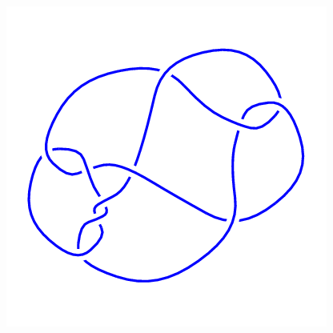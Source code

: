 \begin{figure}[H]
\begin{minipage}[b]{.18\linewidth}
	\end{minipage}
	\begin{minipage}[b]{.18\linewidth}
		\centering
		\includegraphics[width=\linewidth]{../data/10_56.png}
	\end{minipage}
\end{figure}
